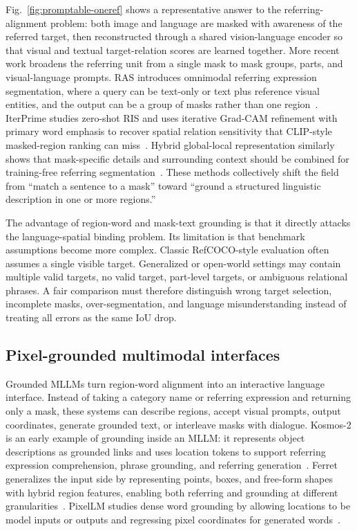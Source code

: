 Fig.~\ref{fig:promptable-oneref} shows a representative answer to the referring-alignment problem: both image and language are masked with awareness of the referred target, then reconstructed through a shared vision-language encoder so that visual and textual target-relation scores are learned together. More recent work broadens the referring unit from a single mask to mask groups, parts, and visual-language prompts. RAS introduces omnimodal referring expression segmentation, where a query can be text-only or text plus reference visual entities, and the output can be a group of masks rather than one region~\citep{caoReferAnySegmentation2025}. IterPrime studies zero-shot RIS and uses iterative Grad-CAM refinement with primary word emphasis to recover spatial relation sensitivity that CLIP-style masked-region ranking can miss~\citep{wangIterprimeZeroshotReferring2025}. Hybrid global-local representation similarly shows that mask-specific details and surrounding context should be combined for training-free referring segmentation~\citep{liuHybridGloballocalRepresentation2025}. These methods collectively shift the field from ``match a sentence to a mask'' toward ``ground a structured linguistic description in one or more regions.''

The advantage of region-word and mask-text grounding is that it directly attacks the language-spatial binding problem. Its limitation is that benchmark assumptions become more complex. Classic RefCOCO-style evaluation often assumes a single visible target. Generalized or open-world settings may contain multiple valid targets, no valid target, part-level targets, or ambiguous relational phrases. A fair comparison must therefore distinguish wrong target selection, incomplete masks, over-segmentation, and language misunderstanding instead of treating all errors as the same IoU drop.

\subsection{Pixel-grounded multimodal interfaces}

Grounded MLLMs turn region-word alignment into an interactive language interface. Instead of taking a category name or referring expression and returning only a mask, these systems can describe regions, accept visual prompts, output coordinates, generate grounded text, or interleave masks with dialogue. Kosmos-2 is an early example of grounding inside an MLLM: it represents object descriptions as grounded links and uses location tokens to support referring expression comprehension, phrase grounding, and referring generation~\citep{pengGroundingMultimodalLarge2024}. Ferret generalizes the input side by representing points, boxes, and free-form shapes with hybrid region features, enabling both referring and grounding at different granularities~\citep{youFerretReferGround2024}. PixelLM studies dense word grounding by allowing locations to be model inputs or outputs and regressing pixel coordinates for generated words~\citep{xuPixelalignedLanguageModel2024}.

